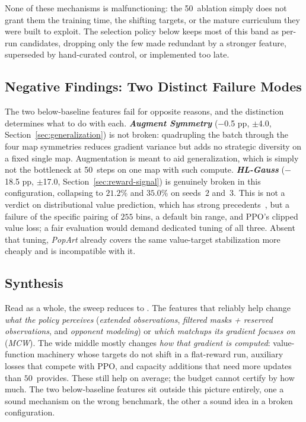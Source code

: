 \medskip

None of these mechanisms is malfunctioning: the 50\, ablation simply does not grant them the training time, the shifting targets, or the mature curriculum they were built to exploit. The selection policy below keeps most of this band as per-run candidates, dropping only the few made redundant by a stronger feature, superseded by hand-curated control, or implemented too late.

\subsection{Negative Findings: Two Distinct Failure Modes}

The two below-baseline features fail for opposite reasons, and the distinction determines what to do with each. \emph{\textbf{Augment Symmetry}} ($-$0.5 pp, $\pm$4.0, Section~\ref{sec:generalization}) is not broken: quadrupling the batch through the four map symmetries reduces gradient variance but adds no strategic diversity on a fixed single map. Augmentation is meant to aid generalization, which is simply not the bottleneck at 50\, steps on one map with such compute. \emph{\textbf{HL-Gauss}} ($-$18.5 pp, $\pm$17.0, Section~\ref{sec:reward-signal}) is genuinely broken in this configuration, collapsing to $21.2$\% and $35.0$\% on seeds~$2$ and~3. This is not a verdict on distributional value prediction, which has strong precedents~\cite{imaniImprovingRegressionDistributional2018, farebrother2024StopRegressing}, but a failure of the specific pairing of $255$ bins, a default bin range, and PPO's clipped value loss; a fair evaluation would demand dedicated tuning of all three. Absent that tuning, \emph{PopArt} already covers the same value-target stabilization more cheaply and is incompatible with it.

\subsection{Synthesis}

Read as a whole, the sweep reduces to \emph{}. The features that reliably help change \emph{what the policy perceives} (\emph{extended observations}, \emph{filtered masks + reserved observations}, and \emph{opponent modeling}) or \emph{which matchups its gradient focuses on} (\emph{MCW}). The wide middle mostly changes \emph{how that gradient is computed}: value-function machinery whose targets do not shift in a flat-reward run, auxiliary losses that compete with PPO, and capacity additions that need more updates than $50$\, provides. These still help on average; the budget cannot certify by how much. The two below-baseline features sit outside this picture entirely, one a sound mechanism on the wrong benchmark, the other a sound idea in a broken configuration.

